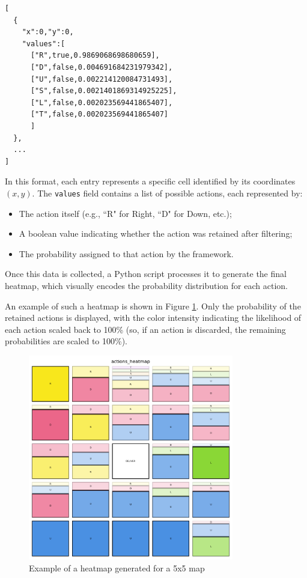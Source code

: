 \begin{verbatim}
[
  {
    "x":0,"y":0,
    "values":[
      ["R",true,0.9869068698680659],
      ["D",false,0.004691684231979342],
      ["U",false,0.002214120084731493],
      ["S",false,0.0021401869314925225],
      ["L",false,0.002023569441865407],
      ["T",false,0.002023569441865407]
      ]
  },
  ...
]
\end{verbatim}

In this format, each entry represents a specific cell identified by its
coordinates $(x,y)$. The \texttt{values} field contains a list of possible
actions, each represented by:
\begin{itemize}
  \item The action itself (e.g., ``R" for Right, ``D" for Down, etc.);

  \item A boolean value indicating whether the action was retained after filtering;

  \item The probability assigned to that action by the framework.
\end{itemize}
Once this data is collected, a Python script processes it to generate the final heatmap,
which visually encodes the probability distribution for each action.

An example of such a heatmap is shown in Figure \ref{fig:heatmap_example}. Only the
probability of the retained actions is displayed, with the color intensity
indicating the likelihood of each action scaled back to 100\% (so, if an action is
discarded, the remaining probabilities are scaled to 100\%).

\begin{figure}[ht!]
  \centering
  \includegraphics[width=0.8\textwidth]{
    images/data_collection/heatmap_example.png
  }
  \caption{Example of a heatmap generated for a 5x5 map}
  \label{fig:heatmap_example}
\end{figure}

